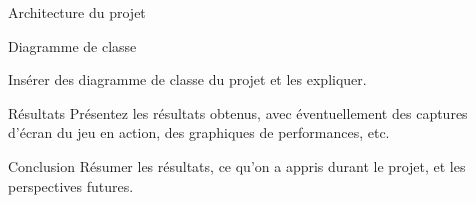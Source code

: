 \documentclass[a4paper, 10pt]{article}
\begin{document}
    \begin{section}{Architecture du projet}\label{sec:architecture}
        \begin{subsection}{Diagramme de classe}
            \par
                Insérer des diagramme de classe du projet et les expliquer.
        \end{subsection}
    \end{section}

    \begin{section}{Résultats}\label{sec:resultats}
        Présentez les résultats obtenus, avec éventuellement des captures d'écran du jeu en action, des graphiques de performances, etc.
    \end{section}

    \begin{section}{Conclusion}\label{sec:conclusion}
        Résumer les résultats, ce qu'on a appris durant le projet, et les perspectives futures.
    \end{section}

    
    
    
\end{document}
